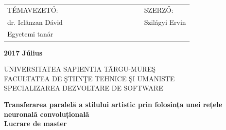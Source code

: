 \documentclass[12pt, a4paper, oneside]{book}
\theoremstyle{tetel}
\begin{document}
\vspace{2cm}
\begin{center}
\begin{tabular}{lcccccccccccl}
    TÉMAVEZETŐ:&&&&&&& &&&&&SZERZŐ:\\
     dr. Iclănzan Dávid&&&&&& &&&&&&Szilágyi Ervin\\
	Egyetemi tanár
\end{tabular}
\end{center}

\begin{center}
    \vspace{0.5cm}\textbf{2017 Július}
\end{center}
\vspace*{\fill}
\newpage
\thispagestyle{empty}
\begin{center}
    \Large UNIVERSITATEA SAPIENTIA TÂRGU-MURE\c{S}\\
    \Large FACULTATEA DE \c{S}TIIN\c{T}E TEHNICE \c{S}I UMANISTE\\
    \Large SPECIALIZAREA DEZVOLTARE DE SOFTWARE\\
\end{center}

\begin{center}
    \vspace{3cm}\LARGE \textbf{Transferarea paralelă a stilului artistic prin folosința unei rețele neuronală convoluțională}\\
    \vspace{1cm}\LARGE\textbf{Lucrare de master}\\
\end{center}
\end{document}
